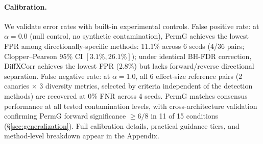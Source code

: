 \paragraph{Calibration.}
We validate error rates with built-in experimental controls.
False positive rate: at $\alpha{=}0.0$ (null control, no synthetic contamination), PermG achieves the lowest FPR among directionally-specific methods: 11.1\% across 6 seeds (4/36 pairs; Clopper--Pearson 95\% CI $[3.1\%, 26.1\%]$); under identical BH-FDR correction, DiffXCorr achieves the lowest FPR (2.8\%) but lacks forward/reverse directional separation.
False negative rate: at $\alpha{=}1.0$, all 6 effect-size reference pairs (2 canaries $\times$ 3 diversity metrics, selected by criteria independent of the detection methods) are recovered at 0\% FNR across 4 seeds.
PermG matches consensus performance at all tested contamination levels, with cross-architecture validation confirming PermG forward significance ${\geq}6/8$ in 11 of 15 conditions (\S\ref{sec:generalization}).
Full calibration details, practical guidance tiers, and method-level breakdown appear in the Appendix.

